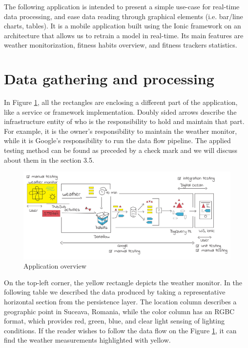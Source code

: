 \clearpage
The following application is intended to present a simple use-case for real-time data processing, and ease data reading through graphical elements (i.e. bar/line charts, tables). It is a mobile application built using the Ionic framework on an architecture that allows us to retrain a model in real-time. Its main features are weather monitorization, fitness habits overview, and fitness trackers statistics. 

\section{Data gathering and processing}

In Figure \ref{fig:arch_overvoew}, all the rectangles are enclosing a different part of the application, like a service or framework implementation. Doubly sided arrows describe the infrastructure entity of who is the responsibility to hold and maintain that part. For example, it is the owner's responsibility to maintain the weather monitor, while it is Google's responsibility to run the data flow pipeline. The applied testing method can be found as preceded by a check mark and we will discuss about them in the section 3.5.

\begin{figure}[!htb]
    \centering
    \includegraphics[width = 15.5cm]{figures/arc}
    \caption{Application overview}
    \label{fig:arch_overvoew}
\end{figure}

On the top-left corner, the yellow rectangle depicts the weather monitor. In the following table we described the data produced by taking a representative horizontal section from the persistence layer. The location column describes a geographic point in Suceava, Romania, while the color column has an RGBC format, which provides red, green, blue, and clear light sensing of lighting conditions. If the reader wishes to follow the data flow on the Figure \ref{fig:arch_overvoew}, it can find the weather measurements highlighted with yellow.

